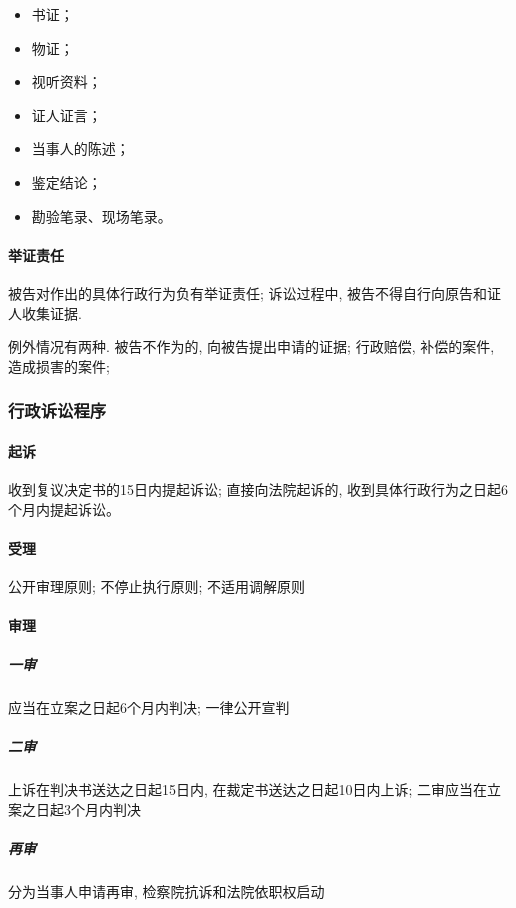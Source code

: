 \begin{itemize}
    \item 书证；
    \item 物证；
    \item 视听资料；
    \item 证人证言；
    \item 当事人的陈述；
    \item 鉴定结论；
    \item 勘验笔录、现场笔录。
\end{itemize}

\paragraph{举证责任} 被告对作出的具体行政行为负有举证责任; 诉讼过程中, 被告不得自行向原告和证人收集证据.

例外情况有两种. 被告不作为的, 向被告提出申请的证据; 行政赔偿, 补偿的案件, 造成损害的案件;

\subsubsection{行政诉讼程序}

\paragraph{起诉} 收到复议决定书的15日内提起诉讼; 直接向法院起诉的, 收到具体行政行为之日起6个月内提起诉讼。

\paragraph{受理} 公开审理原则; 不停止执行原则; 不适用调解原则  

\paragraph{审理}

\subparagraph{一审} 应当在立案之日起6个月内判决; 一律公开宣判

\subparagraph{二审} 上诉在判决书送达之日起15日内, 在裁定书送达之日起10日内上诉; 二审应当在立案之日起3个月内判决

\subparagraph{再审} 分为当事人申请再审, 检察院抗诉和法院依职权启动
